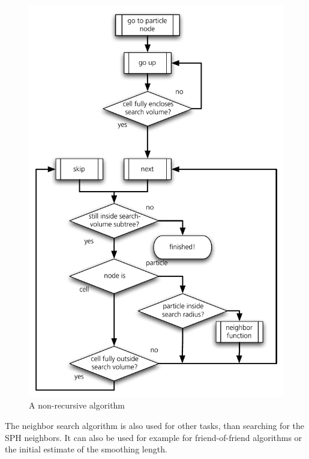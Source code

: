 \begin{figure}[htbp]
\begin{center}
\includegraphics[scale=0.6]{16algo_neighsearch.pdf}
\caption{A non-recursive algorithm }
\label{ch02_grav02_fig10}
\end{center}
\end{figure}

The neighbor search algorithm is also used for other tasks, than searching for the SPH neighbors. It can also be used for example for friend-of-friend algorithms or the initial estimate of the smoothing length.

